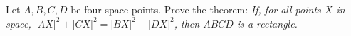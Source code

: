 Let $A, B, C, D$ be four space points. Prove the theorem: \emph{If, for all points $X$ in space, $|AX|^2 + |CX|^2 = |BX|^2 + |DX|^2$, then $ABCD$ is a rectangle.}
